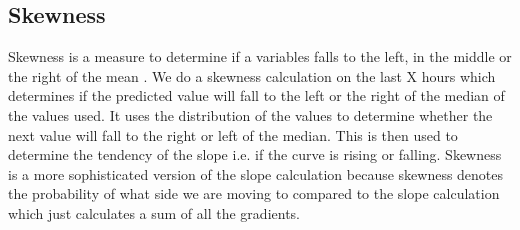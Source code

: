 \subsection{Skewness}
\label{sec:skewness}
Skewness is a measure to determine if a variables falls to the left, in the middle or the right of the mean \cite[Chapter~1.1.2]{econometrics}. We do a skewness calculation on the last X hours which determines if the predicted value will fall to the left or the right of the median of the values used. It uses the distribution of the values to determine whether the next value will fall to the right or left of the median. This is then used to determine the tendency of the slope i.e. if the curve is rising or falling. Skewness is a more sophisticated version of the slope calculation because skewness denotes the probability of what side we are moving to compared to the slope calculation which just calculates a sum of all the gradients. 


